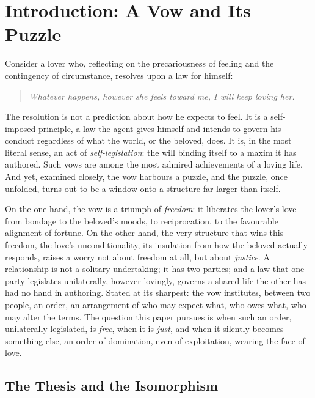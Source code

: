 \documentclass[11pt,a4paper]{article}
\begin{document}
\tableofcontents
\clearpage

\section{Introduction: A Vow and Its Puzzle}\label{p03:sec:intro}

Consider a lover who, reflecting on the precariousness of feeling and the contingency of circumstance, resolves upon a law for himself:

\begin{quote}\itshape
Whatever happens, however she feels toward me, I will keep loving her.
\end{quote}

The resolution is not a prediction about how he expects to feel. It is a self-imposed principle, a law the agent gives himself and intends to govern his conduct regardless of what the world, or the beloved, does. It is, in the most literal sense, an act of \emph{self-legislation}: the will binding itself to a maxim it has authored. Such vows are among the most admired achievements of a loving life. And yet, examined closely, the vow harbours a puzzle, and the puzzle, once unfolded, turns out to be a window onto a structure far larger than itself.

On the one hand, the vow is a triumph of \emph{freedom}: it liberates the lover's love from bondage to the beloved's moods, to reciprocation, to the favourable alignment of fortune. On the other hand, the very structure that wins this freedom, the love's unconditionality, its insulation from how the beloved actually responds, raises a worry not about freedom at all, but about \emph{justice}. A relationship is not a solitary undertaking; it has two parties; and a law that one party legislates unilaterally, however lovingly, governs a shared life the other has had no hand in authoring. Stated at its sharpest: the vow institutes, between two people, an order, an arrangement of who may expect what, who owes what, who may alter the terms. The question this paper pursues is when such an order, unilaterally legislated, is \emph{free}, when it is \emph{just}, and when it silently becomes something else, an order of domination, even of exploitation, wearing the face of love.

\subsection{The Thesis and the Isomorphism}
\end{document}
